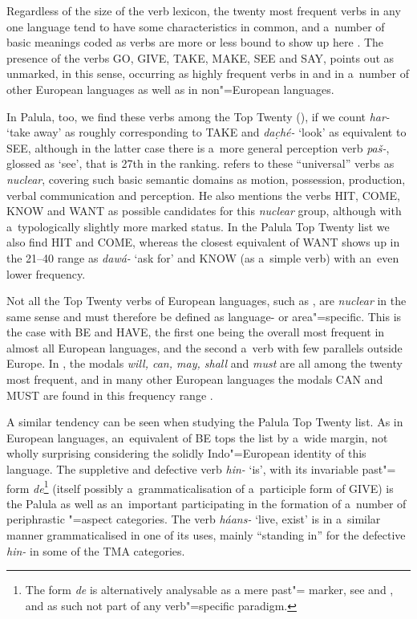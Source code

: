 Regardless of the size of the verb lexicon, the twenty most frequent verbs in any one language tend to have some characteristics in common, and a~number of basic meanings coded as verbs are more or less bound to show up here \citep[209]{viberg2006}. The presence of the verbs GO, GIVE, TAKE, MAKE, SEE and SAY, \citet[247]{viberg1993} points out as unmarked, in this sense, occurring as highly frequent verbs in \iliEnglish and in a~number of other European languages as well as in non"=European languages. 



In Palula, too, we find these verbs among the Top Twenty (), if we count \textit{har-} `take away' as roughly corresponding to TAKE and \textit{dac̣hé-} `look' as equivalent to SEE, although in the latter case there is a~more general perception verb \textit{paš-}, glossed as `see', that is 27th in the ranking. \citet[409]{viberg2006} refers to these ``universal'' verbs as \textit{nuclear}, covering such basic semantic domains as motion, possession, production, verbal communication and perception. He also mentions the verbs HIT, COME, KNOW and WANT as possible candidates for this \textit{nuclear} group, although with a~typologically slightly more marked status. In the Palula Top Twenty list we also find HIT and COME, whereas the closest equivalent of WANT shows up in the 21--40 range as \textit{dawá-} `ask for' and KNOW (as a~simple verb) with an~even lower frequency.



Not all the Top Twenty verbs of European languages, such as \iliEnglish, are \textit{nuclear} in the same sense and must therefore be defined as language- or area"=specific. This is the case with BE and HAVE, the first one being the overall most frequent in almost all European languages, and the second a~verb with few parallels outside Europe. In \iliEnglish, the modals \textit{will, can, may, shall} and \textit{must} are all among the twenty most frequent, and in many other European languages the modals CAN and MUST are found in this frequency range \citep[346--349]{viberg1993}. 



A similar tendency can be seen when studying the Palula Top Twenty list. As in European languages,
an~equivalent of BE tops the list by a~wide margin, not wholly surprising considering the solidly
Indo"=European identity of this language. The suppletive and defective verb \textit{hin-} `is', with its invariable past"= form \textit{de}\footnote{The form \textit{de} is alternatively analysable as a mere past"= marker, see  and , and as such not part of any verb"=specific paradigm.} (itself possibly a~grammaticalisation of a~participle form of GIVE) is the Palula  as well as an~important  participating in the formation of a~number of periphrastic "=aspect categories. The verb \textit{háans-} `live, exist' is in a~similar manner grammaticalised in one of its uses, mainly ``standing in'' for the defective \textit{hin-} in some of the TMA categories.
\largerpage[-1]

